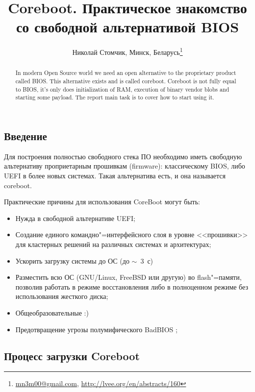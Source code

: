 \documentclass[10pt, a5paper]{article}
\begin{document}
\title{Coreboot. Практическое знакомство со свободной альтернативой BIOS}
\author{Николай Стомчик, Минск, Беларусь\footnote{\url{mn3m00@gmail.com}, \url{http://lvee.org/en/abstracts/160}}}
\maketitle
\begin{abstract}
In modern Open Source world we need an open alternative to the proprietary product called BIOS. This alternative exists and is called coreboot. Coreboot is not fully equal to BIOS, it's only does initialization of RAM, execution of binary vendor blobs and starting some payload. The report main task is to cover how to start using it.
\end{abstract}
\subsection*{Введение}

Для построения полностью свободного стека ПО необходимо иметь свободную альтернативу проприетарным прошивкам \linebreak(firmware): классическому BIOS, либо UEFI в более новых системах. Такая альтернатива есть, и она называется coreboot.

Практические причины для использования CoreBoot \cite{bib1} могут быть:

\begin{itemize}
  \item Нужда в свободной альтернативе UEFI;
  \item Создание единого командно"=интерфейсного слоя в уровне \linebreak <<прошивки>> для кластерных решений на различных системах и архитектурах;
  \item Ускорить загрузку системы до ОС (до $\sim$~3~с)
  \item Разместить всю ОС (GNU/Linux, FreeBSD или другую) во flash"=памяти, позволив работать в режиме восстановления либо в полноценном режиме без использования жесткого диска;
  \item Общеобразовательные :)
  \item Предотвращение угрозы полумифического BadBIOS \cite{bib2, bib3};
\end{itemize}

\subsection*{Процесс загрузки Coreboot}
\end{document}
